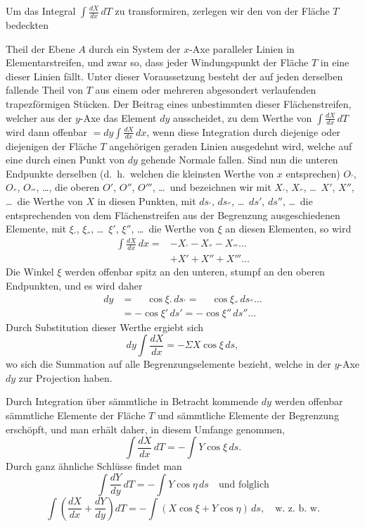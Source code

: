 \documentclass{article}
\begin{document}
Um das Integral $\displaystyle\int \frac{dX}{dx}\,dT$ zu transformiren, zerlegen wir den von der Fläche $T$ bedeckten

Theil der Ebene $A$ durch ein System der $x$-Axe paralleler Linien in Elementarstreifen, und zwar so, dass jeder Windungspunkt der Fläche $T$ in eine dieser Linien fällt. Unter dieser Voraussetzung besteht der auf jeden derselben fallende Theil von $T$ aus einem oder mehreren abgesondert verlaufenden trapezförmigen Stücken. Der Beitrag eines unbestimmten dieser Flächenstreifen, welcher aus der $y$-Axe das Element $dy$ ausscheidet, zu dem Werthe von $\displaystyle\int \frac{dX}{dx}\,dT$ wird dann offenbar $= dy\displaystyle\int \frac{dX}{dx}\,dx$, wenn diese Integration durch diejenige oder diejenigen der Fläche $T$ angehörigen geraden Linien ausgedehnt wird, welche auf eine durch einen Punkt von $dy$ gehende Normale fallen. Sind nun die unteren Endpunkte derselben (d.\ h.\ welchen die kleinsten Werthe von $x$ entsprechen) $O_{'}$, $O_{''}$, $O_{'''}$, \dots, die oberen $O'$, $O''$, $O'''$, \dots\ und bezeichnen wir mit $X_{'}$, $X_{''}$, \dots\ $X'$, $X''$, \dots\ die Werthe von $X$ in diesen Punkten, mit $ds_{'}$, $ds_{''}$, \dots\ $ds'$, $ds''$, \dots\ die entsprechenden von dem Flächenstreifen aus der Begrenzung ausgeschiedenen Elemente, mit $\xi_{'}$, $\xi_{''}$, \dots\ $\xi'$, $\xi''$, \dots\ die Werthe von $\xi$ an diesen Elementen, so wird
\[
\begin{aligned}
\int \frac{dX}{dx}\,dx = & - X_{'} - X_{''} - X_{'''} \dots \\
& + X' + X'' + X''' \dots
\end{aligned}
\]
Die Winkel $\xi$ werden offenbar spitz an den unteren, stumpf an den oberen Endpunkten, und es wird daher
\[
\begin{aligned}
dy &= \phantom{-}\cos\xi_{'}\,ds_{'} = \phantom{-}\cos\xi_{''}\,ds_{''} \dots \\
&= -\cos\xi'\,ds' = -\cos\xi''\,ds'' \dots
\end{aligned}
\]
Durch Substitution dieser Werthe ergiebt sich
\[
dy \int \frac{dX}{dx} = -\Sigma X\cos\xi\,ds,
\]
wo sich die Summation auf alle Begrenzungselemente bezieht, welche in der $y$-Axe $dy$ zur Projection haben.

Durch Integration über sämmtliche in Betracht kommende $dy$ werden offenbar sämmtliche Elemente der Fläche $T$ und sämmtliche Elemente der Begrenzung erschöpft, und man erhält daher, in diesem Umfange genommen,
\[
\int \frac{dX}{dx}\,dT = -\int Y\cos\xi\,ds.
\]
Durch ganz ähnliche Schlüsse findet man
\[
\int \frac{dY}{dy}\,dT = -\int Y\cos\eta\,ds \quad \text{und folglich}
\]
\[
\int \left(\frac{dX}{dx} + \frac{dY}{dy}\right) dT = -\int (X\cos\xi + Y\cos\eta)\,ds, \quad \text{w.\ z.\ b.\ w.}
\]
\end{document}
